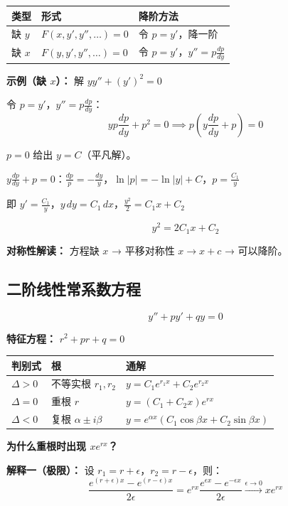\begin{center}
\begin{tabular}{L{3cm}L{4cm}L{5cm}}
\toprule
\textbf{类型} & \textbf{形式} & \textbf{降阶方法} \\
\midrule
缺 $y$ & $F(x, y', y'', \ldots) = 0$ & 令 $p = y'$，降一阶 \\
缺 $x$ & $F(y, y', y'', \ldots) = 0$ & 令 $p = y'$，$y'' = p\frac{dp}{dy}$ \\
\bottomrule
\end{tabular}
\end{center}

\textbf{示例（缺 $x$）：} 解 $yy'' + (y')^2 = 0$

令 $p = y'$，$y'' = p\frac{dp}{dy}$：
\[
yp\frac{dp}{dy} + p^2 = 0 \implies p\left(y\frac{dp}{dy} + p\right) = 0
\]

$p = 0$ 给出 $y = C$（平凡解）。

$y\frac{dp}{dy} + p = 0$：$\frac{dp}{p} = -\frac{dy}{y}$，$\ln|p| = -\ln|y| + C$，$p = \frac{C_1}{y}$

即 $y' = \frac{C_1}{y}$，$y\,dy = C_1\,dx$，$\frac{y^2}{2} = C_1 x + C_2$

\[
\boxed{y^2 = 2C_1 x + C_2}
\]

\textbf{对称性解读：} 方程缺 $x$ → 平移对称性 $x \to x + c$ → 可以降阶。

\subsection{二阶线性常系数方程}

\[
y'' + py' + qy = 0
\]

\textbf{特征方程：} $r^2 + pr + q = 0$

\begin{center}
\begin{tabular}{L{2.5cm}L{3cm}L{5cm}}
\toprule
\textbf{判别式} & \textbf{根} & \textbf{通解} \\
\midrule
$\Delta > 0$ & 不等实根 $r_1, r_2$ & $y = C_1 e^{r_1 x} + C_2 e^{r_2 x}$ \\
$\Delta = 0$ & 重根 $r$ & $y = (C_1 + C_2 x)e^{rx}$ \\
$\Delta < 0$ & 复根 $\alpha \pm i\beta$ & $y = e^{\alpha x}(C_1\cos\beta x + C_2\sin\beta x)$ \\
\bottomrule
\end{tabular}
\end{center}

\textbf{为什么重根时出现 $xe^{rx}$？}

\textbf{解释一（极限）：} 设 $r_1 = r + \epsilon$，$r_2 = r - \epsilon$，则：
\[
\frac{e^{(r+\epsilon)x} - e^{(r-\epsilon)x}}{2\epsilon} = e^{rx}\frac{e^{\epsilon x} - e^{-\epsilon x}}{2\epsilon} \xrightarrow{\epsilon \to 0} xe^{rx}
\]

